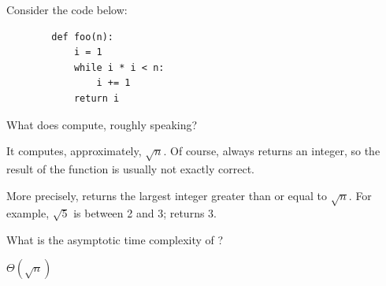 \begin{prob}
    Consider the code below:

    \begin{verbatim}
        def foo(n):
            i = 1
            while i * i < n:
                i += 1
            return i
    \end{verbatim}

    \begin{subprobset}
        \begin{subprob}
            What does  compute, roughly speaking?

            \begin{soln}
                It computes, approximately, $\sqrt{n}$. Of course, 
                always returns an integer, so the result of the function is usually
                not exactly correct.

                More precisely,  returns the largest integer greater
                than or equal to $\sqrt n$. For example, $\sqrt 5$ is between 2 and 3;
                 returns 3.
            \end{soln}
        \end{subprob}

        \begin{subprob}
            What is the asymptotic time complexity of ?

            \begin{soln}
                $\Theta(\sqrt n)$
            \end{soln}
        \end{subprob}
    \end{subprobset}

\end{prob}
